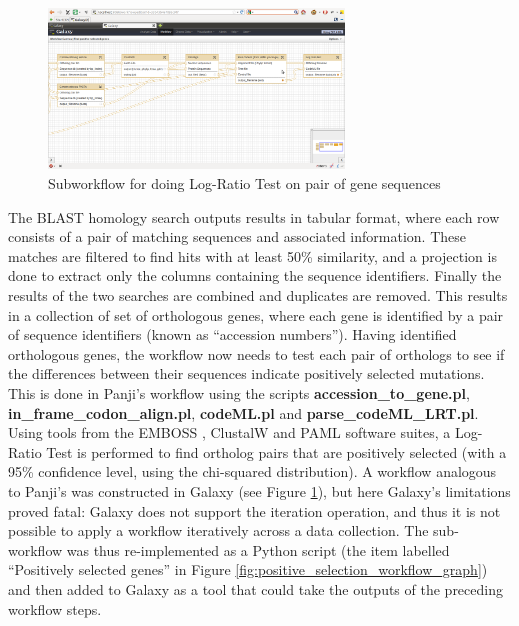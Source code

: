 \documentclass[a4paper,10pt]{scrreprt}
\begin{document}
\begin{figure}[!htp]
\centering
\includegraphics[width=0.7\textwidth]{images/Subworkflow.png}
\caption{Subworkflow for doing Log-Ratio Test on pair of gene sequences}
\label{fig:Subworkflow}
\end{figure}

The BLAST homology search outputs results in tabular format, where each row consists of a pair of matching sequences and associated information. These matches are filtered to find hits with at least 50\% similarity, and a projection is done to extract only the columns containing the sequence identifiers. Finally the results of the two searches are combined and duplicates are removed. This results in a collection of set of orthologous genes, where each gene is identified by a pair of sequence identifiers (known as ``accession numbers''). Having identified orthologous genes, the workflow now needs to test each pair of orthologs to see if the differences between their sequences indicate positively selected mutations. This is done in Panji's workflow using the scripts \textbf{accession\_to\_gene.pl}, \textbf{in\_frame\_codon\_align.pl}, \textbf{codeML.pl} and \textbf{parse\_codeML\_LRT.pl}. Using tools from the EMBOSS \cite{rice_emboss:_2000}, ClustalW \cite{larkin_clustal_2007} and PAML \cite{yang_paml_2007} 
software suites, a Log-Ratio Test is performed to find ortholog pairs that are positively selected (with a 95\% confidence level, using the chi-squared distribution). A workflow analogous to Panji's was constructed in Galaxy (see Figure \ref{fig:Subworkflow}), but here Galaxy's limitations proved fatal: Galaxy does not support the iteration operation, and thus it is not possible to apply a workflow iteratively across a data collection. The sub-workflow was thus re-implemented as a Python script (the item labelled ``Positively selected genes'' in Figure \ref{fig:positive_selection_workflow_graph}) and then added to Galaxy as a tool that could take the outputs of the preceding workflow steps.
\end{document}
